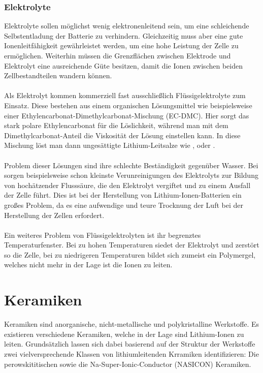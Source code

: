 \documentclass[a4paper, 11pt, headsepline,footsepline,twoside,abstract]{scrbook}
\begin{document}
\subsubsection{Elektrolyte}
Elektrolyte sollen möglichst wenig elektronenleitend sein, um eine schleichende Selbstentladung der Batterie zu verhindern. Gleichzeitig muss aber eine gute Ionenleitfähigkeit gewährleistet werden, um eine hohe Leistung der Zelle zu ermöglichen. Weiterhin müssen die Grenzflächen zwischen Elektrode und Elektrolyt eine ausreichende Güte besitzen, damit die Ionen zwischen beiden Zellbestandteilen wandern können.
\\\\
Als Elektrolyt kommen kommerziell fast ausschließlich Flüssigelektrolyte zum Einsatz. Diese bestehen aus einem organischen Lösungsmittel wie beispielsweise einer Ethylencarbonat-Dimethylcarbonat-Mischung (EC-DMC). Hier sorgt das stark polare Ethylencarbonat für die Löslichkeit, während man mit dem Dimethylcarbonat-Anteil die Viskosität der Lösung einstellen kann. In diese Mischung löst man dann ungesättigte Lithium-Leitsalze wie ,  oder .
\\\\
Problem dieser Lösungen sind ihre schlechte Beständigkeit gegenüber Wasser. Bei  sorgen beispielsweise schon kleinste Verunreinigungen des Elektrolyts zur Bildung von hochätzender Flusssäure, die den Elektrolyt vergiftet und zu einem Ausfall der Zelle führt. Dies ist bei der Herstellung von Lithium-Ionen-Batterien ein großes Problem, da es eine aufwendige und teure Trocknung der Luft bei der Herstellung der Zellen erfordert.
\\\\
Ein weiteres Problem von Flüssigelektrolyten ist ihr begrenztes Temperaturfenster. Bei zu hohen Temperaturen siedet der Elektrolyt und zerstört so die Zelle, bei zu niedrigeren Temperaturen bildet sich zumeist ein Polymergel, welches nicht mehr in der Lage ist die Ionen zu leiten.
\section{Keramiken}
Keramiken sind anorganische, nicht-metallische und polykristalline Werkstoffe. Es existieren verschiedene Keramiken, welche in der Lage sind Lithium-Ionen zu leiten. Grundsätzlich lassen sich dabei basierend auf der Struktur der Werkstoffe zwei vielversprechende Klassen von lithiumleitenden Krramiken identifizieren: Die perowskititischen sowie die Na-Super-Ionic-Conductor (NASICON) Keramiken. 
\end{document}
